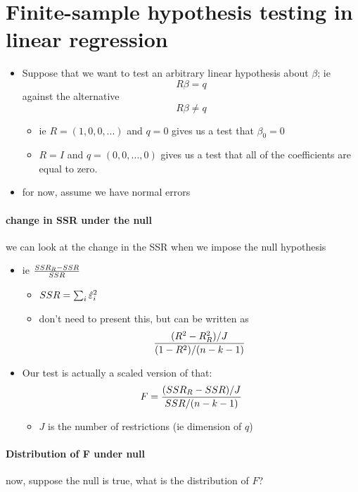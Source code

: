 \section{Finite-sample hypothesis testing in linear regression}

\begin{itemize}

\item Suppose that we want to test an arbitrary linear hypothesis about
  $\beta$; ie \[R \beta = q\] against the alternative \[R \beta \neq q\]
\begin{itemize}
\item ie $R = (1, 0, 0, ...)$ and $q=0$ gives us a test that $\beta_0=0$
\item $R = I$ and $q = (0,0,...,0)$ gives us a test that all of the
         coefficients are equal to zero.
\end{itemize}
\item for now, assume we have normal errors
\end{itemize}

\paragraph{change in SSR under the null}
      we can look at the change in the SSR when we impose the null
        hypothesis
\begin{itemize}
\item ie ${SSR_R - SSR \over SSR}$
\begin{itemize}
\item $SSR = \sum_i \hat{\varepsilon}^2_i$
\item don't need to present this, but can be written as \[
  {(R^2 - R^2_R) / J \over (1-R^2) / (n-k-1)} \]
\end{itemize}
\item Our test is actually a scaled version of that:
  \[ F = {(SSR_R - SSR)/J \over SSR / (n-k-1)} \]
\begin{itemize}
\item $J$ is the number of restrictions (ie dimension of $q$)
\end{itemize}
\end{itemize}

\paragraph{Distribution of F under null}
      now, suppose the null is true, what is the distribution of $F$?

